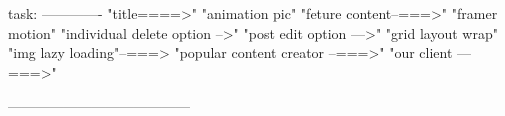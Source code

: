 task:
-------------
"title====>"
"animation pic"
"feture content--===>"
"framer motion"
"individual delete option -->"
"post edit option --->"
"grid layout wrap"
"img lazy loading"--===>
"popular content creator --===>"
"our client ---===>"

---------------------------------------


